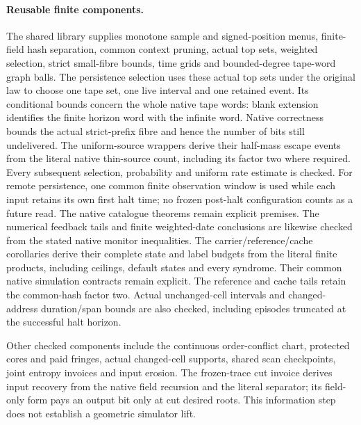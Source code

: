 \paragraph{Reusable finite components.}
The shared library supplies monotone sample and signed-position menus,
finite-field hash separation, common context pruning, actual top sets,
weighted selection, strict small-fibre bounds, time grids and bounded-degree
tape-word graph balls. The persistence selection uses these actual top sets
under the original law to choose one tape set, one live interval and one
retained event. Its conditional bounds concern the whole native tape words:
blank extension identifies the finite horizon word with the infinite word.
Native correctness bounds the actual strict-prefix fibre and hence the number
of bits still undelivered. The uniform-source wrappers derive their half-mass escape events from the
literal native thin-source count, including its factor two where required.
Every subsequent selection, probability and uniform rate estimate is checked.
For remote persistence, one common finite observation window is used while
each input retains its own first halt time; no frozen post-halt configuration
counts as a future read. The native catalogue theorems remain explicit
premises. The numerical feedback tails and finite weighted-date conclusions
are likewise checked from the stated native monitor inequalities.
The carrier/reference/cache corollaries derive their complete state and label
budgets from the literal finite products, including ceilings, default states
and every syndrome. Their common native simulation contracts remain explicit.
The reference and cache tails retain the common-hash factor two. Actual
unchanged-cell intervals and changed-address duration/span bounds are also
checked, including episodes truncated at the successful halt horizon.

Other checked components include the continuous order-conflict chart,
protected cores and paid fringes, actual changed-cell supports, shared scan
checkpoints, joint entropy invoices and input erosion. The frozen-trace cut
invoice derives input recovery from the native field recursion and the literal
separator; its field-only form pays an output bit only at cut desired roots.
This information step does not establish a geometric simulator lift.

